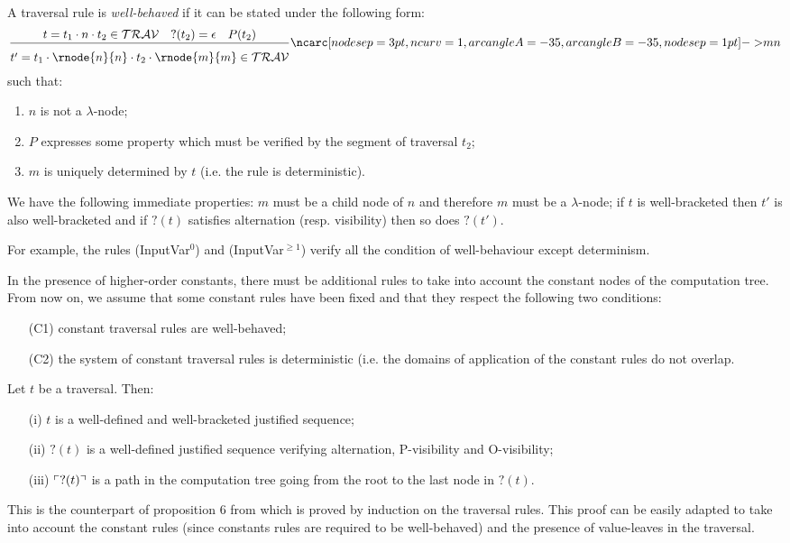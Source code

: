\begin{dfn}
\label{def:wellbehaved_traversal}
A traversal rule is \emph{well-behaved} if it can be stated under the following form:
$$\rulef{t = t_1\cdot n \cdot t_2 \in \travset \quad ?(t_2) = \epsilon \quad P(t_2)}
  { \stackrel{  \rule{0pt}{3pt} }{t' = t_1\cdot \rnode{n}{n} \cdot t_2 \cdot \rnode{m}{m} \in \travset} } \bkptra[nodesep=1pt]{35}{m}{n}$$
such that:
\begin{enumerate}
  \item $n$ is not a $\lambda$-node;
  \item $P$ expresses some property which must be verified by the segment of traversal $t_2$;
  \item $m$ is uniquely determined by $t$ (i.e. the rule is deterministic).
\end{enumerate}
\end{dfn}
We have the following immediate properties: $m$ must be a child node of $n$ and therefore $m$ must be a $\lambda$-node;
if $t$ is well-bracketed then $t'$ is also well-bracketed
and if $?(t)$ satisfies alternation (resp. visibility) then so does $?(t')$.


For example, the rules (InputVar$^0$) and (InputVar$^{\geq1}$) verify all the condition of well-behaviour except determinism.


In the presence of higher-order constants, there must be additional rules to take into account the
constant nodes of the computation tree.
From now on, we assume that some constant rules have been fixed and that they respect the following two conditions:
\begin{itemize}
  \item[(C1)] constant traversal rules are well-behaved;
  \item[(C2)] the system of constant traversal rules is deterministic (i.e. the domains of application of the
  constant rules do not overlap.
\end{itemize}


\begin{prop}
\label{prop:pviewtrav_is_path}
Let $t$ be a traversal. Then:
\begin{itemize}
\item[(i)] $t$ is a well-defined and well-bracketed justified sequence;
\item[(ii)] $?(t)$ is a well-defined justified sequence verifying alternation, P-visibility and O-visibility;
\item[(iii)] $\ulcorner ?(t) \urcorner$ is a path in the computation tree going from the root to the last node in $?(t)$.
\end{itemize}
\end{prop}
This is the counterpart of proposition 6 from \cite{OngHoMchecking2006} which is proved by induction on the traversal rules.
This proof can be easily adapted to take into account the constant rules (since constants rules are required to be well-behaved)
and the presence of value-leaves in the traversal.

